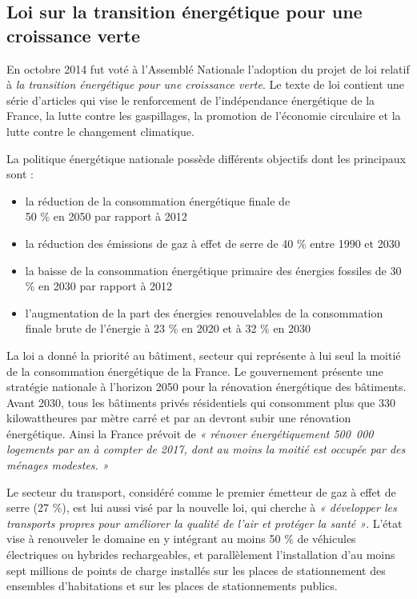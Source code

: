 \subsection{Loi sur la transition énergétique pour une croissance verte}


En octobre 2014 fut voté à l'Assemblé Nationale l’adoption du projet de loi relatif à \textit{la transition énergétique pour une croissance verte}. Le texte de loi contient une série d’articles qui vise le renforcement de l’indépendance énergétique de la France, la lutte contre les gaspillages, la promotion de l’économie circulaire et la lutte contre le changement climatique.


\bigbreak
La politique énergétique nationale possède différents objectifs dont les principaux sont \cite{loi_te} :
\begin{itemize}
  \item la réduction de la consommation énergétique finale de\\50 \% en 2050 par rapport à 2012
  \item la réduction des émissions de gaz à effet de serre de 40 \% entre 1990 et 2030
  \item la baisse de la consommation énergétique primaire des énergies fossiles de 30 \% en 2030 par rapport à 2012
  \item l'augmentation de la part des énergies renouvelables de la consommation finale brute de l’énergie à 23 \% en 2020 et à 32 \% en 2030
\end{itemize}


\bigbreak
La loi a donné la priorité au bâtiment, secteur qui représente à lui seul la moitié de la consommation énergétique de la France. Le gouvernement présente une stratégie nationale à l’horizon 2050 pour la rénovation énergétique des bâtiments. Avant 2030, tous les bâtiments privés résidentiels qui consomment plus que 330 kilowattheures par mètre carré et par an devront subir une rénovation énergétique. Ainsi la France prévoit de \textit{« rénover énergétiquement 500~000 logements par an à compter de 2017, dont au moins la moitié est occupée par des ménages modestes. »}


\bigbreak
Le secteur du transport, considéré comme le premier émetteur de gaz à effet de serre (27 \%), est lui aussi visé par la nouvelle loi, qui cherche à \textit{« développer les transports propres pour améliorer la qualité de l’air et protéger la santé »}. L’état vise à renouveler le domaine en y intégrant au moins 50 \% de véhicules électriques ou hybrides rechargeables, et parallèlement l’installation d’au moins sept millions de points de charge installés sur les places de stationnement des ensembles d’habitations et sur les places de stationnements publics.


